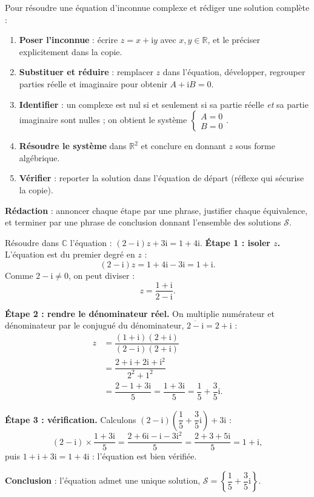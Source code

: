 \documentclass[11pt]{article}
\begin{document}
\begin{methode}
Pour résoudre une équation d'inconnue complexe et rédiger une solution complète :
\begin{enumerate}
\item \textbf{Poser l'inconnue} : écrire $z = x + \mathrm{i}y$ avec $x, y \in \mathbb{R}$, et le préciser explicitement dans la copie.
\item \textbf{Substituer et réduire} : remplacer $z$ dans l'équation, développer, regrouper parties réelle et imaginaire pour obtenir $A + \mathrm{i}B = 0$.
\item \textbf{Identifier} : un complexe est nul si et seulement si sa partie réelle \emph{et} sa partie imaginaire sont nulles ; on obtient le système $\begin{cases} A = 0 \\ B = 0 \end{cases}$.
\item \textbf{Résoudre le système} dans $\mathbb{R}^2$ et conclure en donnant $z$ sous forme algébrique.
\item \textbf{Vérifier} : reporter la solution dans l'équation de départ (réflexe qui sécurise la copie).
\end{enumerate}
\textbf{Rédaction} : annoncer chaque étape par une phrase, justifier chaque équivalence, et terminer par une phrase de conclusion donnant l'ensemble des solutions $\mathcal{S}$.
\end{methode}

\begin{exoresolu}
Résoudre dans $\mathbb{C}$ l'équation : $(2 - \mathrm{i})z + 3\mathrm{i} = 1 + 4\mathrm{i}$.
\tcblower
\textbf{Étape 1 : isoler $z$.} L'équation est du premier degré en $z$ :
\[(2 - \mathrm{i})z = 1 + 4\mathrm{i} - 3\mathrm{i} = 1 + \mathrm{i}.\]
Comme $2 - \mathrm{i} \neq 0$, on peut diviser :
\[z = \dfrac{1 + \mathrm{i}}{2 - \mathrm{i}}.\]

\textbf{Étape 2 : rendre le dénominateur réel.} On multiplie numérateur et dénominateur par le conjugué du dénominateur, $\overline{2 - \mathrm{i}} = 2 + \mathrm{i}$ :
\begin{align*}
z &= \dfrac{(1 + \mathrm{i})(2 + \mathrm{i})}{(2 - \mathrm{i})(2 + \mathrm{i})}\\
&= \dfrac{2 + \mathrm{i} + 2\mathrm{i} + \mathrm{i}^2}{2^2 + 1^2}\\
&= \dfrac{2 - 1 + 3\mathrm{i}}{5} = \dfrac{1 + 3\mathrm{i}}{5} = \dfrac{1}{5} + \dfrac{3}{5}\mathrm{i}.
\end{align*}

\textbf{Étape 3 : vérification.} Calculons $(2 - \mathrm{i})\left(\dfrac{1}{5} + \dfrac{3}{5}\mathrm{i}\right) + 3\mathrm{i}$ :
\[(2 - \mathrm{i})\times\dfrac{1 + 3\mathrm{i}}{5} = \dfrac{2 + 6\mathrm{i} - \mathrm{i} - 3\mathrm{i}^2}{5} = \dfrac{2 + 3 + 5\mathrm{i}}{5} = 1 + \mathrm{i},\]
puis $1 + \mathrm{i} + 3\mathrm{i} = 1 + 4\mathrm{i}$ : l'équation est bien vérifiée.

\textbf{Conclusion} : l'équation admet une unique solution, $\mathcal{S} = \left\{\dfrac{1}{5} + \dfrac{3}{5}\mathrm{i}\right\}$.
\end{exoresolu}
\end{document}
